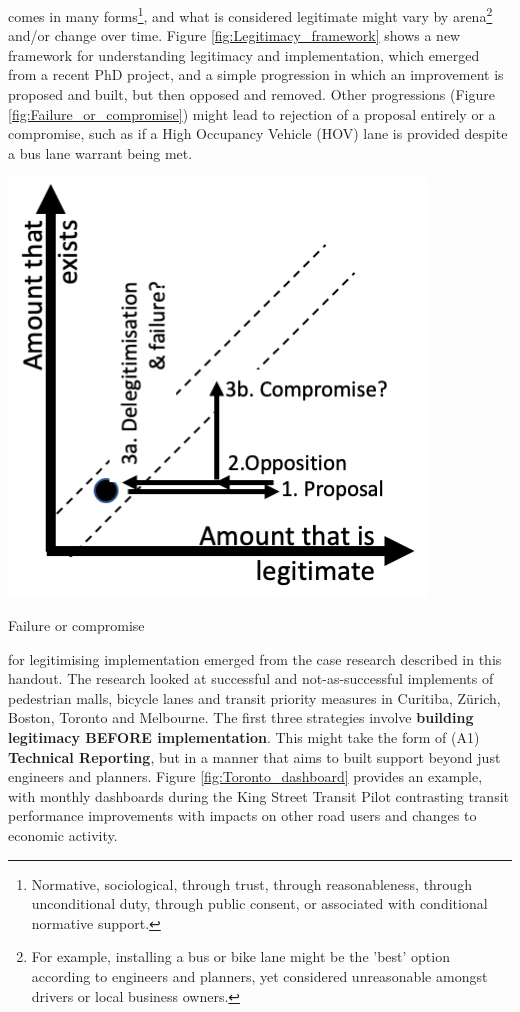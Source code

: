 \documentclass{tufte-handout}
\begin{document}
 comes in many forms\footnote{Normative, sociological, through trust, through reasonableness, through unconditional duty, through public consent, or associated with conditional normative support.}, and what is considered legitimate might vary by arena\footnote{For example, installing a bus or bike lane might be the 'best' option according to engineers and planners, yet considered unreasonable amongst drivers or local business owners.} and/or change over time. Figure \ref{fig:Legitimacy_framework} shows a new framework for understanding legitimacy and implementation, which emerged from a recent PhD project\cite{Reynolds:2020aa}, and a simple progression in which an improvement is proposed and built, but then opposed and removed. Other progressions (Figure \ref{fig:Failure_or_compromise}) might lead to rejection of a proposal entirely or a compromise, such as if a High Occupancy Vehicle (HOV) lane is provided despite a bus lane warrant being met. 

\begin{marginfigure}%
  \includegraphics[width=\linewidth]{Failure_or_compromise}
  \caption{Failure or compromise}
  \label{fig:Failure_or_compromise}
\end{marginfigure}



 for legitimising implementation emerged from the case research described in this handout. The research looked at successful and not-as-successful implements of pedestrian malls, bicycle lanes and transit priority measures in Curitiba, Zürich, Boston, Toronto and Melbourne.  The first three strategies involve \textbf{building legitimacy BEFORE implementation}. This might take the form of (A1) \textbf{Technical Reporting}, but in a manner that aims to built support beyond just engineers and planners. Figure \ref{fig:Toronto_dashboard} provides an example, with monthly dashboards during the King Street Transit Pilot contrasting transit performance improvements with impacts on other road users and changes to economic activity. 
\end{document}
